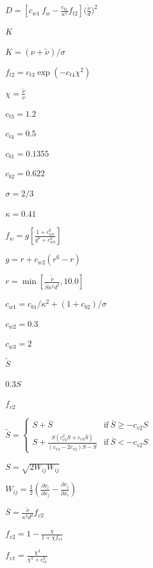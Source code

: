 \documentclass{article}
\begin{document}
$ D = \left[ c_{w1}\ f_{w} - \frac{c_{b1}}{\kappa^2} f_{t2} \right] \bigg( \frac{\tilde{\nu}}{d} \bigg)^2 $
\pagebreak

$ K $
\pagebreak

$ K = ( \nu + \tilde{\nu} ) / \sigma $
\pagebreak

$ f_{t2} = c_{t3} \exp(-c_{t4} \chi^2)$
\pagebreak

$\chi = \frac{\tilde{\nu}}{\nu} $
\pagebreak

$ c_{t3} = 1.2$
\pagebreak

$c_{t4} = 0.5 $
\pagebreak

$ c_{b1} = 0.1355 $
\pagebreak

$ c_{b2} = 0.622 $
\pagebreak

$ \sigma = 2/3 $
\pagebreak

$ \kappa = 0.41 $
\pagebreak

$ f_{w}  =  g \left[ \frac{1+c_{w3}^6}{g^6 + c_{w3}^3} \right] $
\pagebreak

$ g = r + c_{w2} (r^6 - r) $
\pagebreak

$ r = \min \left[\frac{\tilde{\nu}}{\tilde{S} \kappa^2 d^2}, 10.0 \right] $
\pagebreak

$ c_{w1} = c_{b1}/\kappa^2 + (1+c_{b2})/\sigma $
\pagebreak

$ c_{w2} = 0.3 $
\pagebreak

$ c_{w3} = 2 $
\pagebreak

$ \tilde{S} $
\pagebreak

$ 0.3 S $
\pagebreak

$ f_{v2} $
\pagebreak

$
\displaystyle
\tilde{S} = \left\{
\begin{array}{ll}
S + \overline{S} & \mbox{if}\ \overline{S} \geq -c_{v2} S \\
S + \frac{S \left( c_{v2}^2 S + c_{v3} \overline{S} \right)}{\left( c_{v3} - 2 c_{v2} \right) S - \overline{S}}& \mbox{if}\ \overline{S} < -c_{v2} S
\end{array}
\right.
$
\pagebreak

$ S = \sqrt{2 W_{ij} W_{ij}} $
\pagebreak

$ W_{ij} = \frac{1}{2} \left( \frac{\partial v_i}{\partial x_j} - \frac{\partial v_j}{\partial x_i} \right) $
\pagebreak

$ \overline{S} = \frac{\tilde{\nu}}{\kappa^2 d^2} f_{v2} $
\pagebreak

$ f_{v2} = 1 - \frac{\chi}{1+\chi f_{v1}}$
\pagebreak

$ f_{v1} = \frac{\chi^3}{\chi^3 + c_{v1}^3} $
\pagebreak
\end{document}
